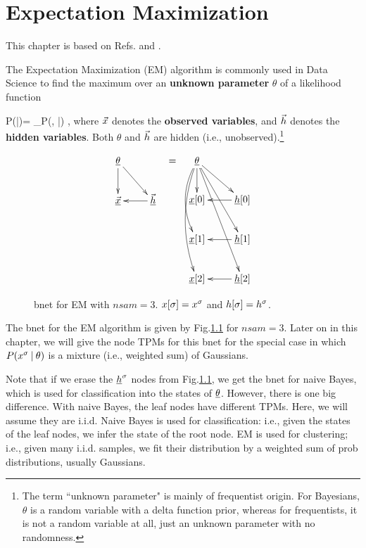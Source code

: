 \chapter{Expectation Maximization}
\label{ch-emax}

This chapter is based on
Refs.\cite{wiki-em}
and \cite{emory-biostat}.

The Expectation Maximization (EM)
algorithm
is commonly used in Data Science
to find the maximum
over an {\bf unknown parameter} $\theta$ of a
 likelihood function

\beq
P(\vecx|\theta)=
\sum_\vech P(\vecx, \vech|\theta)
\;,
\eeq
where ${\vec{x}}$
denotes the {\bf observed variables},
and ${\vec{h}}$ denotes the
{\bf hidden variables}.
Both $\theta$
and ${\vec{h}}$
are hidden (i.e.,
unobserved).\footnote{
The term
``unknown parameter"
is mainly of frequentist origin.
For Bayesians, $\theta$
is a random variable with
a delta function prior,
whereas for frequentists,
it is not
a random variable at all,
just an unknown parameter
with no randomness.}



\begin{figure}[h!]
\centering
$$\begin{array}{ccc}
\xymatrix{
\ul{\theta}\ar[d]\ar[dr]
\\
\ul{\vecx}&\ul{\vech}\ar[l]
}
&=&
\xymatrix{
\ul{\theta}
\ar[d]
\ar@/_1pc/[dd]
\ar@/_1pc/[ddd]
\ar[rd]\ar[rdd]\ar[rddd]
\\
\rvx[0]
&\rvh[0]\ar[l]
\\
\rvx[1]
&\rvh[1]\ar[l]
\\
\rvx[2]
&\rvh[2]\ar[l]
}
\end{array}
$$
\caption{bnet for EM with $nsam=3$.
$x[\sigma]=x^\sigma$ and $h[\sigma]=h^\sigma$.}
\label{fig-em-bnet}
\end{figure}


The bnet for the EM algorithm
is given by Fig.\ref{fig-em-bnet}
for $nsam=3$.
Later on in this chapter,
we will give the node TPMs
for this bnet for
the special
case in which $P(x^\sigma{\:\mathbf{|}\:} \theta)$
is a mixture (i.e., weighted sum)
of Gaussians.

Note that if we
erase the ${\underline{h}}^\sigma$ nodes
from Fig.\ref{fig-em-bnet},
we get the bnet for naive Bayes,
which is used for classification
into the states of $\underline{\theta}$.
However, there is one big
difference.
With naive Bayes,
the leaf nodes have
different TPMs.
Here, we will assume they are i.i.d.
Naive Bayes is used for classification: i.e.,
given the states
of the leaf nodes,
we infer the state of the root node.
EM is used for clustering; i.e.,
given many i.i.d. samples,
we fit their distribution by a weighted sum
of prob distributions,
usually Gaussians.

